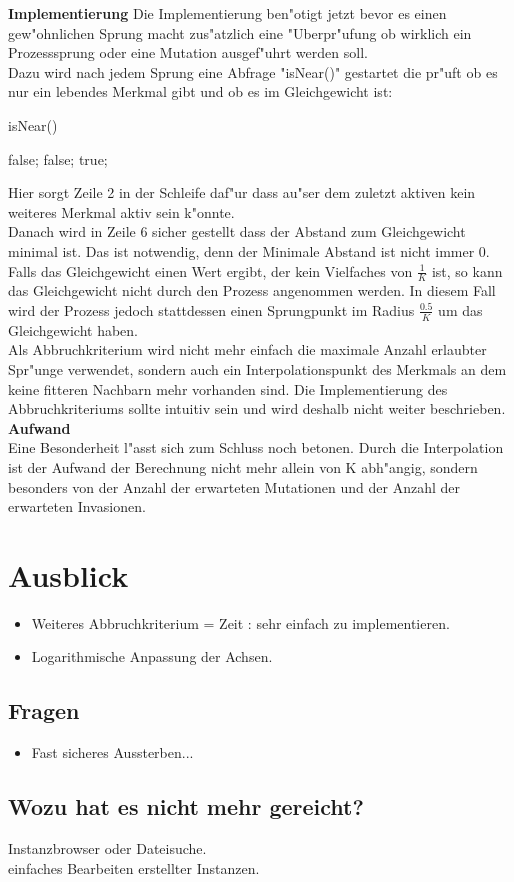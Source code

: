 \documentclass[11pt, a4paper, german]{article}
\theoremstyle{plain}
\begin{document}
	\textbf{Implementierung}
	Die Implementierung ben"otigt jetzt bevor es einen gew"ohnlichen Sprung macht zus"atzlich eine "Uberpr"ufung ob wirklich ein Prozesssprung oder eine Mutation ausgef"uhrt werden soll.\\
	Dazu wird nach jedem Sprung eine Abfrage "isNear()" gestartet die pr"uft ob es nur ein lebendes Merkmal gibt und ob es im Gleichgewicht ist:
	\begin{algorithm}[H]
		\caption{isNear()}
		\begin{algorithmic}[1]
					\RETURN false;
				\ENDIF
			\ENDFOR
				\RETURN false;
			\ENDIF
			\RETURN true;
		\end{algorithmic}
	\end{algorithm}
	Hier sorgt Zeile 2 in der Schleife daf"ur dass au"ser dem zuletzt aktiven kein weiteres Merkmal aktiv sein k"onnte.\\
	Danach wird in Zeile 6 sicher gestellt dass der Abstand zum Gleichgewicht minimal ist. Das ist notwendig, denn der Minimale Abstand ist nicht immer $ 0 $. Falls das Gleichgewicht einen Wert ergibt, der kein Vielfaches von $ \frac{1}{K} $ ist, so kann das Gleichgewicht nicht durch den Prozess angenommen werden. In diesem Fall wird der Prozess jedoch stattdessen einen Sprungpunkt im Radius $ \frac{0.5}{K} $ um das Gleichgewicht haben.\\
	Als Abbruchkriterium wird nicht mehr einfach die maximale Anzahl erlaubter Spr"unge verwendet, sondern auch ein Interpolationspunkt des Merkmals an dem keine fitteren Nachbarn mehr vorhanden sind. Die Implementierung des Abbruchkriteriums sollte intuitiv sein und wird deshalb nicht weiter beschrieben.\\
	
	\textbf{Aufwand}\\
	Eine Besonderheit l"asst sich zum Schluss noch betonen. Durch die Interpolation ist der Aufwand der Berechnung nicht mehr allein von K abh"angig, sondern besonders von der Anzahl der erwarteten Mutationen und der Anzahl der erwarteten Invasionen.
	

\clearpage
\section{Ausblick}

\begin{itemize}
	\item Weiteres Abbruchkriterium = Zeit : sehr einfach zu implementieren.
	\item Logarithmische Anpassung der Achsen.
\end{itemize}
\subsection{Fragen}
\begin{itemize}
	\item Fast sicheres Aussterben...
\end{itemize}
\subsection{Wozu hat es nicht mehr gereicht?}
Instanzbrowser oder Dateisuche.\\
einfaches Bearbeiten erstellter Instanzen.\\
\clearpage

\end{document}
